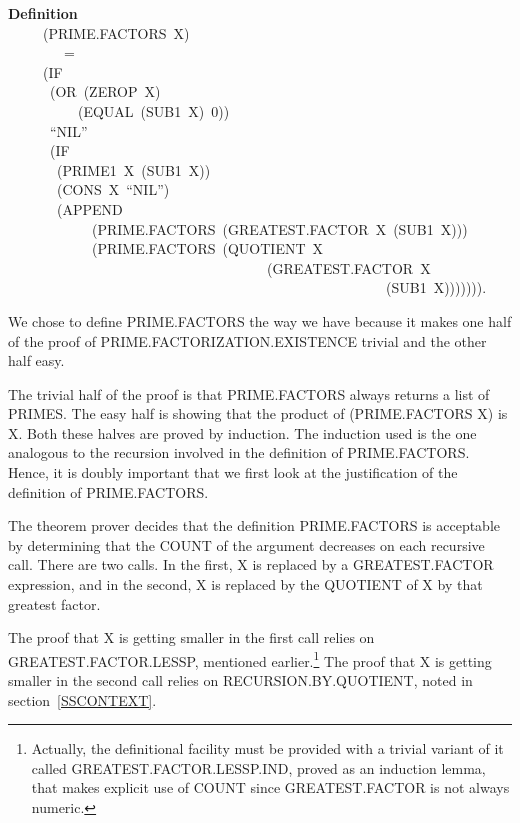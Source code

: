 \documentclass[10pt]{book}
\newenvironment{pubasis}{\begin{flushleft}}{\end{flushleft}}
\newcommand{\axiomordefinition}[1]{\vspace{6pt}\Large\textsf{\textbf{#1}}\normalsize}
\begin{document}
\begin{pubasis}
\axiomordefinition{Definition}\\
~~~~~(PRIME.FACTORS~X)\\
~~~~~~~~=\\
~~~~~(IF\\
~~~~~~(OR~(ZEROP~X)\\
~~~~~~~~~~(EQUAL~(SUB1~X)~0))\\
~~~~~~``NIL''\\
~~~~~~(IF\\
~~~~~~~(PRIME1~X~(SUB1~X))\\
~~~~~~~(CONS~X~``NIL'')\\
~~~~~~~(APPEND\\
~~~~~~~~~~~~(PRIME.FACTORS~(GREATEST.FACTOR~X~(SUB1~X)))\\
~~~~~~~~~~~~(PRIME.FACTORS~(QUOTIENT~X\\
~~~~~~~~~~~~~~~~~~~~~~~~~~~~~~~~~~~~~(GREATEST.FACTOR~X\\
~~~~~~~~~~~~~~~~~~~~~~~~~~~~~~~~~~~~~~~~~~~~~~~~~~~~~~(SUB1~X))))))).\\
\end{pubasis}
We chose to define PRIME.FACTORS the way we have
because it makes one half of the proof of PRIME.FACTORIZATION.EXISTENCE trivial
and the other half easy.  

The trivial half of the
proof is that PRIME.FACTORS always returns a list
of PRIMES.  The easy half is showing that 
the product of (PRIME.FACTORS X) is X.
Both these halves are proved by induction.
The induction used is the one analogous
to the recursion involved in the
definition of PRIME.FACTORS.  Hence, it
is doubly important that we first look
at the justification of the definition of PRIME.FACTORS.

The theorem prover decides that the definition
PRIME.FACTORS is acceptable by determining that
the COUNT of the argument decreases on
each recursive call.  There are two calls.  In the first, X is replaced by
a GREATEST.FACTOR expression, and in the second, X is replaced
by the QUOTIENT of X by that greatest factor.

The proof that X is getting smaller in the first call relies on
GREATEST.FACTOR.LESSP, mentioned earlier.\footnote{Actually, the definitional  facility must be provided with a trivial variant of it called GREATEST.FACTOR.LESSP.IND, proved as an induction lemma, that makes explicit use of COUNT since GREATEST.FACTOR is not always numeric.}  The proof that X is getting smaller in the second call
relies on RECURSION.BY.QUOTIENT, noted in section~\ref{SSCONTEXT}.
\end{document}
